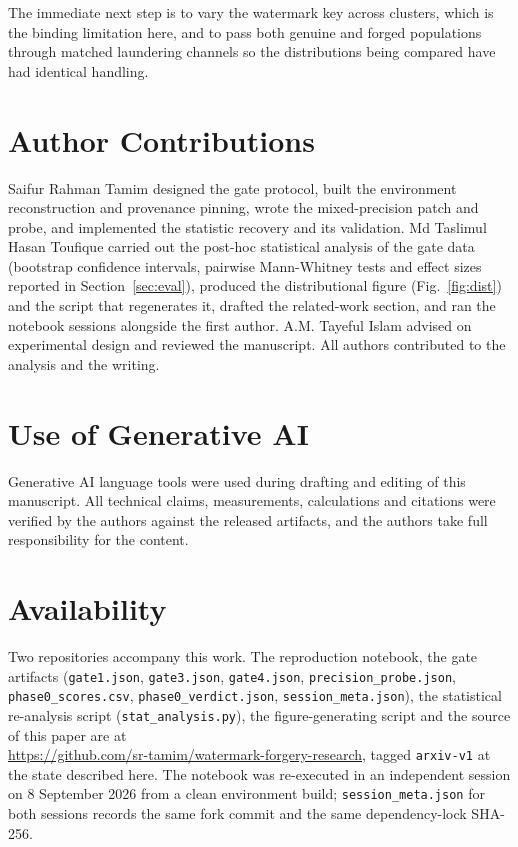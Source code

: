 \documentclass[10pt,twocolumn]{article}
\newcommand{\code}[1]{\texttt{\small #1}}
\begin{document}
The immediate next step is to vary the watermark key across clusters, which is the
binding limitation here, and to pass both genuine and forged populations through
matched laundering channels so the distributions being compared have had identical
handling.

\section*{Author Contributions}

Saifur Rahman Tamim designed the gate protocol, built the environment reconstruction
and provenance pinning, wrote the mixed-precision patch and probe, and implemented the
statistic recovery and its validation. Md Taslimul Hasan Toufique carried out the
post-hoc statistical analysis of the gate data (bootstrap confidence intervals,
pairwise Mann-Whitney tests and effect sizes reported in Section~\ref{sec:eval}),
produced the distributional figure (Fig.~\ref{fig:dist}) and the script that
regenerates it, drafted the related-work section, and ran the notebook sessions
alongside the first author. A.M. Tayeful Islam
advised on experimental design and reviewed the manuscript. All authors contributed
to the analysis and the writing.

\section*{Use of Generative AI}

Generative AI language tools were used during drafting and editing of this manuscript.
All technical claims, measurements, calculations and citations were verified by the
authors against the released artifacts, and the authors take full responsibility for
the content.

\section*{Availability}

Two repositories accompany this work. The reproduction notebook, the gate artifacts
(\code{gate1.json}, \code{gate3.json}, \code{gate4.json},
\code{precision\_probe.json}, \code{phase0\_scores.csv},
\code{phase0\_verdict.json}, \code{session\_meta.json}), the statistical re-analysis
script (\code{stat\_analysis.py}), the figure-generating script and the source of
this paper are at\\
\url{https://github.com/sr-tamim/watermark-forgery-research},
tagged \code{arxiv-v1} at the state described here. The notebook was re-executed in an
independent session on 8 September 2026 from a clean environment build;
\code{session\_meta.json} for both sessions records the same fork commit and the same
dependency-lock SHA-256.
\end{document}

